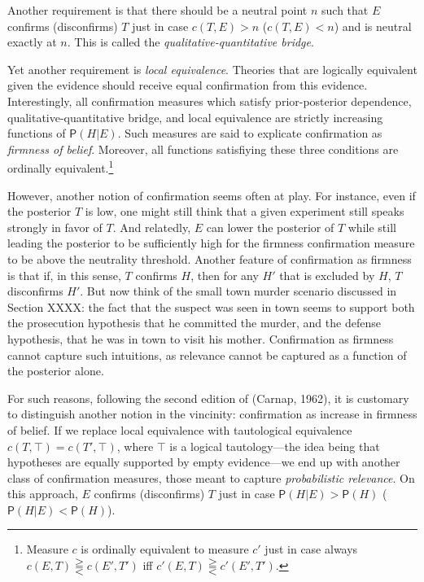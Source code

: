 \documentclass[10pt,dvipsnames,enabledeprecatedfontcommands]{scrartcl}
\newcommand{\pr}[1]{\mathsf{P}(#1)}
\begin{document}
Another requirement is that there should be a neutral point \(n\) such
that \(E\) confirms (disconfirms) \(T\) just in case \(c(T,E)>n\)
(\(c(T,E)<n\)) and is neutral exactly at \(n\). This is called the
\emph{qualitative-quantitative bridge}.

Yet another requirement is \emph{local equivalence}. Theories that are
logically equivalent given the evidence should receive equal
confirmation from this evidence. Interestingly, all confirmation
measures which satisfy prior-posterior dependence,
qualitative-quantitative bridge, and local equivalence are strictly
increasing functions of \(\pr{H \vert E}\). Such measures are said to
explicate confirmation as \emph{firmness of belief}. Moreover, all
functions satisfiying these three conditions are ordinally
equivalent.\footnote{Measure $c$ is ordinally equivalent to measure $c'$ just in case always $c(E , T) \gtreqqless c(E', T')$ iff $c'(E , T) \gtreqqless c'(E' , T')$.}

However, another notion of confirmation seems often at play. For
instance, even if the posterior \(T\) is low, one might still think that
a given experiment still speaks strongly in favor of \(T\). And
relatedly, \(E\) can lower the posterior of \(T\) while still leading
the posterior to be sufficiently high for the firmness confirmation
measure to be above the neutrality threshold. Another feature of
confirmation as firmness is that if, in this sense, \(T\) confirms
\(H\), then for any \(H'\) that is excluded by \(H\), \(T\) disconfirms
\(H'\). But now think of the small town murder scenario discussed in
Section XXXX: the fact that the suspect was seen in town seems
to support both the prosecution hypothesis that he committed the murder,
and the defense hypothesis, that he was in town to visit his mother.
Confirmation as firmness cannot capture such intuitions, as relevance
cannot be captured as a function of the posterior alone.

For such reasons, following the second edition of (Carnap, 1962), it is
customary to distinguish another notion in the vincinity: confirmation
as increase in firmness of belief. If we replace local equivalence with
tautological equivalence \(c(T, \top) = c(T', \top)\), where \(\top\) is
a logical tautology---the idea being that hypotheses are equally
supported by empty evidence---we end up with another class of
confirmation measures, those meant to capture
\emph{probabilistic relevance}. On this approach, \(E\) confirms
(disconfirms) \(T\) just in case \(\pr{H \vert E} > \pr{H}\)
(\(\pr{H \vert E} < \pr{H}\)).
\end{document}
